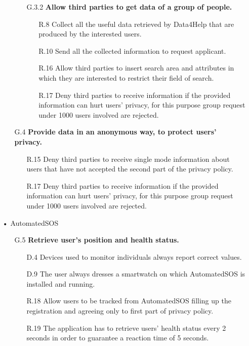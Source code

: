 \begin{enumerate}
\begin{enumerate}
\begin{enumerate}
    	\item [G.3.2] \textbf{Allow third parties to get data of a group of people.}
		\begin{enumerate}
	\item [R.8] Collect all the useful data retrieved by Data4Help that are produced by the interested users.
    	\item [R.10] Send all the collected information to request applicant.
    	\item [R.16] Allow third parties to insert search area and attributes in which they are interested to restrict their field of search.
    	\item [R.17] Deny third parties to receive information if the provided information can hurt users' privacy, for this purpose group request under 1000 users involved are rejected.
    	\end{enumerate}
    	\end{enumerate}
    	
    \item [G.4] \textbf{Provide data in an anonymous way, to protect users' privacy.}
		\begin{enumerate}
    	\item [R.15] Deny third parties to receive single mode information about users that have not accepted the second part of the privacy policy.
    	\item [R.17] Deny third parties to receive information if the provided information can hurt users' privacy, for this purpose group request under 1000 users involved are rejected.
    	\end{enumerate}	
			
	\end{enumerate}
	
	
\item[•]{\Large AutomatedSOS}
	
	\begin{enumerate}
	\item [G.5] \textbf{Retrieve user's position and health status.}
		\begin{enumerate}
		\item [D.4] Devices used to monitor individuals always report correct values.
		\item [D.9] The user always dresses a smartwatch on which AutomatedSOS is installed and running.
		\item [R.18] Allow users to be tracked from AutomatedSOS filling up the registration and agreeing only to first part of privacy policy.    
		\item [R.19] The application has to retrieve users' health status every 2 seconds in order to guarantee a reaction time of 5 seconds.
		\end{enumerate}
	

\end{enumerate}
\end{enumerate}
